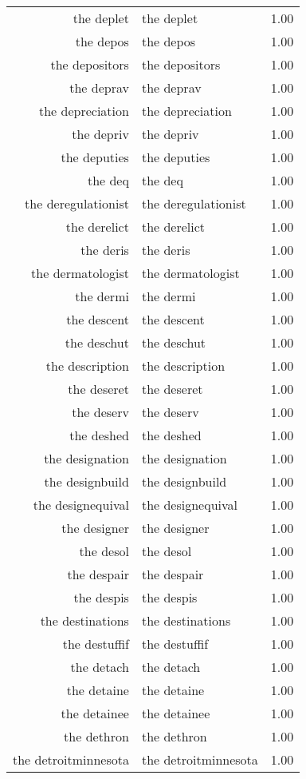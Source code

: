 \begin{table}[ht]
\begin{tabular}{rlr}
  the deplet & the deplet & 1.00 \\ 
  the depos & the depos & 1.00 \\ 
  the depositors & the depositors & 1.00 \\ 
  the deprav & the deprav & 1.00 \\ 
  the depreciation & the depreciation & 1.00 \\ 
  the depriv & the depriv & 1.00 \\ 
  the deputies & the deputies & 1.00 \\ 
  the deq & the deq & 1.00 \\ 
  the deregulationist & the deregulationist & 1.00 \\ 
  the derelict & the derelict & 1.00 \\ 
  the deris & the deris & 1.00 \\ 
  the dermatologist & the dermatologist & 1.00 \\ 
  the dermi & the dermi & 1.00 \\ 
  the descent & the descent & 1.00 \\ 
  the deschut & the deschut & 1.00 \\ 
  the description & the description & 1.00 \\ 
  the deseret & the deseret & 1.00 \\ 
  the deserv & the deserv & 1.00 \\ 
  the deshed & the deshed & 1.00 \\ 
  the designation & the designation & 1.00 \\ 
  the designbuild & the designbuild & 1.00 \\ 
  the designequival & the designequival & 1.00 \\ 
  the designer & the designer & 1.00 \\ 
  the desol & the desol & 1.00 \\ 
  the despair & the despair & 1.00 \\ 
  the despis & the despis & 1.00 \\ 
  the destinations & the destinations & 1.00 \\ 
  the destuffif & the destuffif & 1.00 \\ 
  the detach & the detach & 1.00 \\ 
  the detaine & the detaine & 1.00 \\ 
  the detainee & the detainee & 1.00 \\ 
  the dethron & the dethron & 1.00 \\ 
  the detroitminnesota & the detroitminnesota & 1.00 \\ 

\end{tabular}
\end{table}
